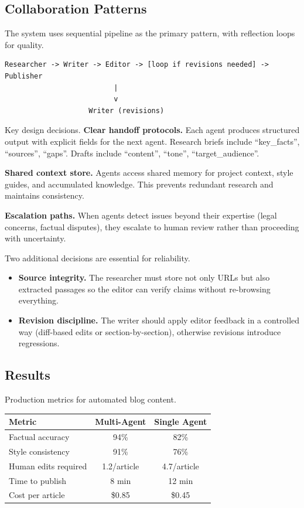 \subsection{Collaboration Patterns}

The system uses sequential pipeline as the primary pattern, with reflection loops for quality. {\footnotesize{\footnotesize
\begin{verbatim}
Researcher -> Writer -> Editor -> [loop if revisions needed] -> Publisher
                          |
                          v
                    Writer (revisions)
\end{verbatim}
}}

Key design decisions. \textbf{Clear handoff protocols.} Each agent produces structured output with explicit fields for the next agent. Research briefs include ``key\_facts'', ``sources'', ``gaps''. Drafts include ``content'', ``tone'', ``target\_audience''.

\textbf{Shared context store.} Agents access shared memory for project context, style guides, and accumulated knowledge. This prevents redundant research and maintains consistency.

\textbf{Escalation paths.} When agents detect issues beyond their expertise (legal concerns, factual disputes), they escalate to human review rather than proceeding with uncertainty.

Two additional decisions are essential for reliability.
\begin{itemize}
\item \textbf{Source integrity.} The researcher must store not only URLs but also extracted passages so the editor can verify claims without re-browsing everything.
\item \textbf{Revision discipline.} The writer should apply editor feedback in a controlled way (diff-based edits or section-by-section), otherwise revisions introduce regressions.
\end{itemize}

\subsection{Results}

Production metrics for automated blog content.

\begin{center}
\begin{tabular}{lcc}
\toprule
Metric & Multi-Agent & Single Agent \\
\midrule
Factual accuracy & 94\% & 82\% \\
Style consistency & 91\% & 76\% \\
Human edits required & 1.2/article & 4.7/article \\
Time to publish & 8 min & 12 min \\
Cost per article & \$0.85 & \$0.45 \\
\bottomrule
\end{tabular}
\end{center}

